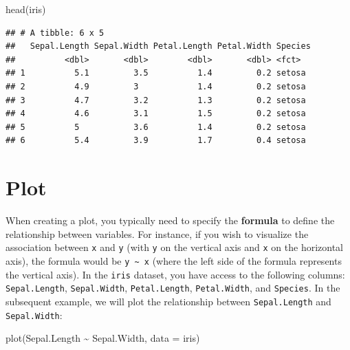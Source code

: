\documentclass[
]{book}
\newenvironment{Shaded}{\begin{snugshade}}{\end{snugshade}}
\newcommand{\AttributeTok}[1]{\textcolor[rgb]{0.77,0.63,0.00}{#1}}
\newcommand{\FunctionTok}[1]{\textcolor[rgb]{0.00,0.00,0.00}{#1}}
\newcommand{\NormalTok}[1]{#1}
\newcommand{\SpecialCharTok}[1]{\textcolor[rgb]{0.00,0.00,0.00}{#1}}
\begin{document}
\begin{Shaded}
\begin{Highlighting}[]
\FunctionTok{head}\NormalTok{(iris)}
\end{Highlighting}
\end{Shaded}

\begin{verbatim}
## # A tibble: 6 x 5
##   Sepal.Length Sepal.Width Petal.Length Petal.Width Species
##          <dbl>       <dbl>        <dbl>       <dbl> <fct>  
## 1          5.1         3.5          1.4         0.2 setosa 
## 2          4.9         3            1.4         0.2 setosa 
## 3          4.7         3.2          1.3         0.2 setosa 
## 4          4.6         3.1          1.5         0.2 setosa 
## 5          5           3.6          1.4         0.2 setosa 
## 6          5.4         3.9          1.7         0.4 setosa
\end{verbatim}

\hypertarget{plot}{%
\section{Plot}\label{plot}}

When creating a plot, you typically need to specify the \textbf{formula} to define the relationship between variables. For instance, if you wish to visualize the association between \texttt{x} and \texttt{y} (with \texttt{y} on the vertical axis and \texttt{x} on the horizontal axis), the formula would be \texttt{y\ \textasciitilde{}\ x} (where the left side of the formula represents the vertical axis). In the \texttt{iris} dataset, you have access to the following columns: \texttt{Sepal.Length}, \texttt{Sepal.Width}, \texttt{Petal.Length}, \texttt{Petal.Width}, and \texttt{Species}. In the subsequent example, we will plot the relationship between \texttt{Sepal.Length} and \texttt{Sepal.Width}:

\begin{Shaded}
\begin{Highlighting}[]
\FunctionTok{plot}\NormalTok{(Sepal.Length }\SpecialCharTok{\textasciitilde{}}\NormalTok{ Sepal.Width, }\AttributeTok{data =}\NormalTok{ iris)}
\end{Highlighting}
\end{Shaded}
\end{document}
